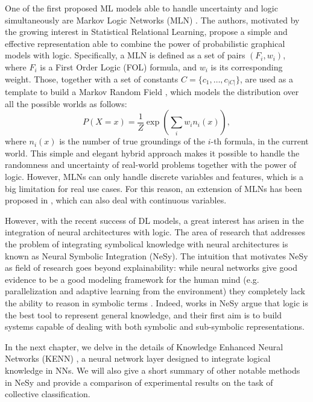 One of the first proposed ML models able to handle uncertainty and logic simultaneously are Markov Logic Networks (MLN) \cite{richardson2006markov}. The authors, motivated by the growing interest in Statistical Relational Learning, propose a simple and effective representation able to combine the power of probabilistic graphical models with logic.
Specifically, a MLN is defined as a set of pairs $(F_i, w_i)$, where $F_i$ is a First Order Logic (FOL) formula, and $w_i$ is its corresponding weight. Those, together with a set of constants $C=\{c_1,\dots,c_{|C|}\}$, are used as a template to build a Markov Random Field \cite{pearl2014probabilistic}, which models the distribution over all the possible worlds as follows:
\begin{equation*}
P(X=x)=\frac{1}{Z} \exp \left(\sum_{i} w_{i} n_{i}(x)\right),
\end{equation*}
where $n_i(x)$ is the number of true groundings of the $i$-th formula, in the current world. 
This simple and elegant hybrid approach makes it possible to handle the randomness and uncertainty of real-world problems together with the power of logic. However, MLNs can only handle discrete variables and features, which is a big limitation for real use cases. For this reason, an extension of MLNs has been proposed in \cite{wang2008hybrid}, which can also deal with continuous variables.

However, with the recent success of DL models, a great interest has arisen in the integration of neural architectures with logic. The area of research that addresses the problem of integrating symbolical knowledge with neural architectures is known as Neural Symbolic Integration (NeSy). The intuition that motivates NeSy as field of research goes beyond explainability: while neural networks give good evidence to be a good modeling framework for the human mind (e.g. parallelization and adaptive learning from the environment) they completely lack the ability to reason in symbolic terms \cite{Besold2017NeuralSymbolicLA}. Indeed, works in NeSy argue that logic is the best tool to represent general knowledge, and their first aim is to build systems capable of dealing with both symbolic and sub-symbolic representations.

In the next chapter, we delve in the details of Knowledge Enhanced Neural Networks (KENN) \cite{daniele2019kenn}, a neural network layer designed to integrate logical knowledge in NNs. We will also give a short summary of other notable methods in NeSy and provide a comparison of experimental results on the task of collective classification.




